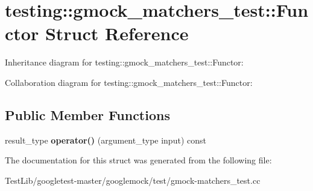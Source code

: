 \hypertarget{structtesting_1_1gmock__matchers__test_1_1Functor}{}\section{testing\+:\+:gmock\+\_\+matchers\+\_\+test\+:\+:Functor Struct Reference}
\label{structtesting_1_1gmock__matchers__test_1_1Functor}


Inheritance diagram for testing\+:\+:gmock\+\_\+matchers\+\_\+test\+:\+:Functor\+:


Collaboration diagram for testing\+:\+:gmock\+\_\+matchers\+\_\+test\+:\+:Functor\+:
\subsection*{Public Member Functions}
\begin{DoxyCompactItemize}
\item 
\mbox{\label{structtesting_1_1gmock__matchers__test_1_1Functor_a5beee965d62e6bc1d591163659bad913}} 
result\+\_\+type {\bfseries operator()} (argument\+\_\+type input) const
\end{DoxyCompactItemize}


The documentation for this struct was generated from the following file\+:\begin{DoxyCompactItemize}
\item 
Test\+Lib/googletest-\/master/googlemock/test/gmock-\/matchers\+\_\+test.\+cc\end{DoxyCompactItemize}
